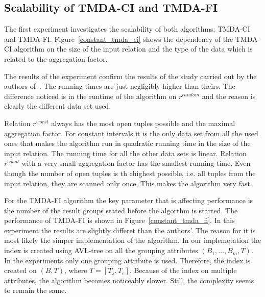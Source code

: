 \documentclass[a4paper,11pt]{article}
\begin{document}
\subsection{Scalability of TMDA-CI and TMDA-FI}

The first experiment investigates the scalability of both algorithms: TMDA-CI and TMDA-FI. Figure~\ref{constant_tmda_ci} shows the dependency of the TMDA-CI algorithm on the size of the input relation and the type of the data which is related to the aggregation factor.

The results of the experiment confirm the results of the study carried out by the authors of~\cite{bohlen}. The running times are just negligibly higher than theirs. The difference noticed is in the runtime of the algorithm on $r^{random}$ and the reason is clearly the different data set used.

Relation $r^{worst}$ always has the most open tuples possible and the maximal aggregation factor. For constant intervals it is the only data set from all the used ones that makes the algorithm run in quadratic running time in the size of the input relation. The running time for all the other data sets is linear. Relation $r^{equal}$ with a very small aggregation factor has the smallest running time. Even though the number of open tuples is th ehighest possible, i.e. all tuples from the input relation, they are scanned only once. This makes the algorithm very fast.

For the TMDA-FI algorithm the key parameter that is affecting performance is the number of the result groups stated before the algorthm is started. The performance of TMDA-FI is shown in Figure~\ref{constant_tmda_fi}. In this experiment the results are slightly differet than the authors'. The reason for it is most likely the simper implementation of the algorithm. In our implemetation the index is created using AVL-tree on all the grouping attributes $(B_1,\dots,B_m,T)$. In the experiments only one grouping attribute is used. Therefore, the index is created on $(B,T)$, where $T = [T_s, T_e ]$. Because of the index on multiple attributes, the algorithm becomes noticeably slower. Still, the complexity seems to remain the same.
\end{document}
